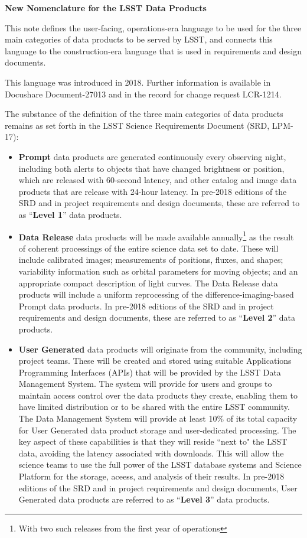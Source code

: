 \documentclass[12pt]{article}
\begin{document}
\vskip 0.2in
\centerline{\bf New Nomenclature for the LSST Data Products} 
\vskip 0.1in

This note defines the user-facing, operations-era language to be used for the three
main categories of data products to be served by LSST, and connects this language to
the construction-era language that is used in requirements and design documents.

This language was introduced in 2018.  
Further information is available in Docushare Document-27013 and in the record for change request LCR-1214.

The substance of the definition of the three main categories of data products remains as set forth in the LSST Science Requirements Document (SRD, LPM-17):

\begin{itemize}
\item {\bf Prompt} data products are generated continuously every observing night, including both alerts to objects that have changed brightness or position, which are released with 60-second latency, and other catalog and image data products that are release with 24-hour latency.
In pre-2018 editions of the SRD and in project requirements and design documents, these are referred to as ``{\bf Level 1}'' data products.
\item {\bf Data Release} data products will be made available annually\footnote{With two such releases from the first year of operations} as the result of coherent processings of the entire science data set to date.
These will include calibrated images; measurements of positions, fluxes, and shapes; variability information such as orbital parameters for moving objects; and an appropriate compact description of light curves. 
The Data Release data products will include a uniform reprocessing of the difference-imaging-based Prompt data products.
In pre-2018 editions of the SRD and in project requirements and design documents, these are referred to as ``{\bf Level 2}'' data products.
\item {\bf User Generated} data products will originate from the community, including project teams.
These will be created and stored using suitable Applications Programming Interfaces (APIs) that will be provided by the LSST Data Management System. 
The system will provide for users and groups to maintain access control over the data products they create, enabling them to have limited distribution or to be shared with the entire LSST community.
The Data Management System will provide at least 10\% of its total capacity for User Generated data product storage and user-dedicated processing. 
The key aspect of these capabilities is that they will reside ``next to" the LSST data, avoiding the latency associated with downloads. 
This will allow the science teams to use the full power of the LSST database systems and Science Platform for the storage, aceess, and analysis of their results.
In pre-2018 editions of the SRD and in project requirements and design documents, User Generated data products are referred to as ``{\bf Level 3}'' data products.
\end{itemize}
\end{document}
